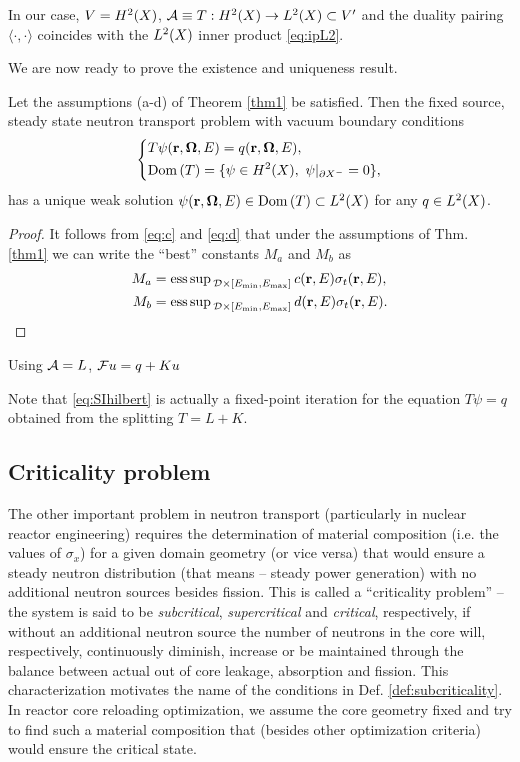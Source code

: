 {In our case, $V = \Hp[2](X)$, $\genop{A} \equiv T : \Hp[2](X) \to \Lp[2](X) \subset V'$ and the duality pairing
$\langle \cdot,\cdot\rangle$ coincides with the $\Lp[2](X)$ inner product \eqref{eq:ipL2}.


We are now ready to prove the existence and uniqueness result.
\begin{theorem}
	Let the assumptions (a-d) of Theorem \ref{thm1} be satisfied.
	Then the fixed source, steady state neutron transport problem with vacuum boundary conditions 
\begin{equation*}
  \left\{
  \begin{aligned}
     &T\psi(\br,\bomega,E) = q(\br,\bomega,E),\\
     &\Dom{T} = \{\psi\in \Hp[2](X),\ \psi\vert_{\pX[-]} = 0\},
  \end{aligned}
  \right.
\end{equation*}
has a unique weak solution $\psi(\br,\bomega,E)\in\Dom{T}\subset\Lp[2](X)$ for any $q\in \Lp[2](X)$.
\end{theorem}
\begin{proof}
	It follows from \eqref{eq:c} and \eqref{eq:d} that under the assumptions of Thm. \ref{thm1} we can write the ``best''
	constants $M_a$ and $M_b$ as 
	$$
	\begin{aligned}
		M_a &= \esssup_{\VV\times[\Emin,\Emax]} c(\br,E)\sigma_t(\br,E), \\
		M_b &= \esssup_{\VV\times[\Emin,\Emax]}	d(\br,E)\sigma_t(\br,E). 
	\end{aligned}
	$$
\end{proof}

Using $\genop{A} = L$,
$\genop{F}u = q + Ku$

Note that \eqref{eq:SIhilbert} is actually a fixed-point iteration for the equation $T\psi = q$ obtained from the
splitting $T = L + K$.
}
\subsection{Criticality problem}\label{sec:criticality}

The other important problem in neutron transport (particularly in nuclear reactor engineering) requires the
determination of material composition (i.e. the values of $\sigma_x$) for a given domain geometry (or vice versa)
that would ensure a steady neutron distribution (that means -- steady power generation) with no additional neutron
sources besides fission. This is called a ``criticality problem'' -- the system is said to be \textit{subcritical},
\textit{supercritical} and \textit{critical}, respectively, if without an additional neutron source the number of
neutrons in the core will, respectively, continuously diminish, increase or be maintained through the
balance between actual out of core leakage, absorption and fission. This characterization motivates the name of the
conditions in Def. \ref{def:subcriticality}. In reactor core reloading optimization, we assume the core geometry fixed
and try to find such a material composition that (besides other optimization criteria) would ensure the critical state. 


